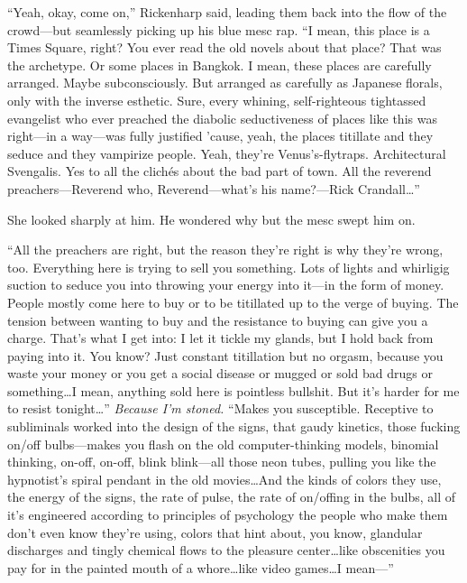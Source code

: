 ``Yeah, okay, come on,'' Rickenharp said, leading them back into the flow of the crowd---but seamlessly picking up his blue mesc rap. ``I mean, this place is a Times Square, right? You ever read the old novels about that place? That was the archetype. Or some places in Bangkok. I mean, these places are carefully arranged. Maybe subconsciously. But arranged as carefully as Japanese florals, only with the inverse esthetic. Sure, every whining, self-righteous tightassed evangelist who ever preached the diabolic seductiveness of places like this was right---in a way---was fully justified 'cause, yeah, the places titillate and they seduce and they vampirize people. Yeah, they're Venus's-flytraps. Architectural Svengalis. Yes to all the clichés about the bad part of town. All the reverend preachers---Reverend who, Reverend---what's his name?---Rick Crandall\ldots ''

She looked sharply at him. He wondered why but the mesc swept him on.

``All the preachers are right, but the reason they're right is why they're wrong, too. Everything here is trying to sell you something. Lots of lights and whirligig suction to seduce you into throwing your energy into it---in the form of money. People mostly come here to buy or to be titillated up to the verge of buying. The tension between wanting to buy and the resistance to buying can give you a charge. That's what I get into: I let it tickle my glands, but I hold back from paying into it. You know? Just constant titillation but no orgasm, because you waste your money or you get a social disease or mugged or sold bad drugs or something\ldots I mean, anything sold here is pointless bullshit. But it's harder for me to resist tonight\ldots '' \textit{Because I'm stoned.} ``Makes you susceptible. Receptive to subliminals worked into the design of the signs, that gaudy kinetics, those fucking on/off bulbs---makes you flash on the old computer-thinking models, binomial thinking, on-off, on-off, blink blink---all those neon tubes, pulling you like the hypnotist's spiral pendant in the old movies\ldots And the kinds of colors they use, the energy of the signs, the rate of pulse, the rate of on/offing in the bulbs, all of it's engineered according to principles of psychology the people who make them don't even know they're using, colors that hint about, you know, glandular discharges and tingly chemical flows to the pleasure center\ldots like obscenities you pay for in the painted mouth of a whore\ldots like video games\ldots I mean---''

